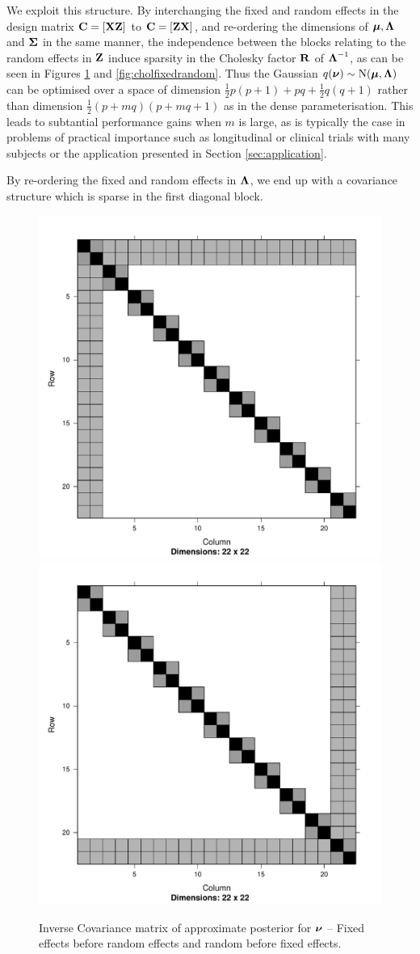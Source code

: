 \noindent We exploit this structure. By interchanging the fixed and random effects in the design matrix ${\bf C} = [{\bf X} {\bf Z}]$ to ${\bf C} = [{\bf Z} {\bf X}]$, and re-ordering the dimensions of ${\boldsymbol \mu}, {\boldsymbol \Lambda}$ and ${\boldsymbol \Sigma}$ in the same manner, the independence between the
blocks relating to the random effects in ${\bf Z}$ induce sparsity in the Cholesky factor ${\bf R}$ of
${\boldsymbol \Lambda}^{-1}$, as can be seen in Figures \ref{fig:covfixedrandom} and
\ref{fig:cholfixedrandom}. Thus the Gaussian $q({\boldsymbol \nu}) \sim \text{N}({\boldsymbol \mu}, {\boldsymbol \Lambda})$ can be optimised over a space of dimension $\frac{1}{2} p (p + 1) + pq + \frac{1}{2} q (q + 1)$ rather than dimension
$\frac{1}{2} (p + mq) (p + mq + 1)$ as in the dense parameterisation. This leads to subtantial performance gains
when $m$ is large, as is typically the case in problems of practical importance such as longitudinal or 
clinical trials with many subjects or the application presented in Section \ref{sec:application}.
		
By re-ordering the fixed and random effects in ${\boldsymbol \Lambda}$, we end up with a covariance structure which is 
sparse in the first diagonal block.

\begin{figure}[h!]
	\includegraphics[width=0.45 \textwidth]{mX_mZ_mLambda.pdf}
	\includegraphics[width=0.45 \textwidth]{mZ_mX_mLambda.pdf}
	\caption{Inverse Covariance matrix of approximate posterior for ${\boldsymbol \nu}$ -- Fixed effects before random effects
						and random before fixed effects.}
	\label{fig:covfixedrandom}
\end{figure}
	
